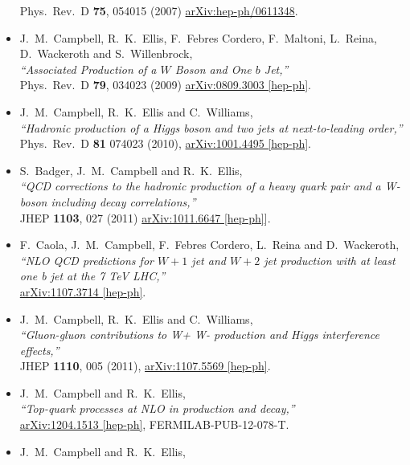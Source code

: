 \begin{itemize}
  Phys.\ Rev.\ D {\bf 75}, 054015 (2007)
  \href{https://arxiv.org/abs/hep-ph/0611348}{arXiv:hep-ph/0611348}.
%
\item J.~M.~Campbell, R.~K.~Ellis, F.~Febres Cordero, F.~Maltoni, L.~Reina, D.~Wackeroth and S.~Willenbrock, \\
  {\it ``Associated Production of a $W$ Boson and One $b$ Jet,''} \\
  Phys.\ Rev.\  D {\bf 79}, 034023 (2009)
  \href{https://arxiv.org/abs/0809.3003}{arXiv:0809.3003 [hep-ph]}.
%
\item J.~M.~Campbell, R.~K.~Ellis and C.~Williams, \\
  {\it ``Hadronic production of a Higgs boson and two jets at next-to-leading order,''} \\
   Phys.\ Rev.\ D {\bf 81} 074023 (2010),
  \href{https://arxiv.org/abs/1001.4495}{arXiv:1001.4495 [hep-ph]}.
%
\item S.~Badger, J.~M.~Campbell and R.~K.~Ellis, \\
  {\it ``QCD corrections to the hadronic production of a heavy quark pair and a  W-boson including decay correlations,''} \\
 JHEP {\bf 1103}, 027 (2011)
  \href{https://arxiv.org/abs/1011.6647}{arXiv:1011.6647 [hep-ph]}].
%
\item F.~Caola, J.~M.~Campbell, F.~Febres Cordero, L.~Reina and D.~Wackeroth, \\
  {\it ``NLO QCD predictions for $W+1$ jet and $W+2$ jet production with at least one b jet at the 7 TeV LHC,''} \\
    \href{https://arxiv.org/abs/1107.3714}{arXiv:1107.3714 [hep-ph]}.
%
\item J.~M.~Campbell, R.~K.~Ellis and C.~Williams, \\
  {\it ``Gluon-gluon contributions to W+ W- production and Higgs interference effects,''} \\
  JHEP {\bf 1110}, 005 (2011),
  \href{https://arxiv.org/abs/1107.5569}{arXiv:1107.5569 [hep-ph]}.
%
\item J.~M.~Campbell and R.~K.~Ellis, \\
  {\it ``Top-quark processes at NLO in production and decay,''} \\
  \href{https://arxiv.org/abs/1204.1513}{arXiv:1204.1513 [hep-ph]}, FERMILAB-PUB-12-078-T.
%
\item J.~M.~Campbell and R.~K.~Ellis, \\

\end{itemize}
